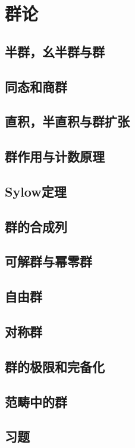 \chapter{群论}

\section{半群，幺半群与群}
\section{同态和商群}
\section{直积，半直积与群扩张}
\section{群作用与计数原理}
\section{Sylow定理}
\section{群的合成列}
\section{可解群与幂零群}
\section{自由群}
\section{对称群}
\section{群的极限和完备化}
\section{范畴中的群}
\section{习题}
